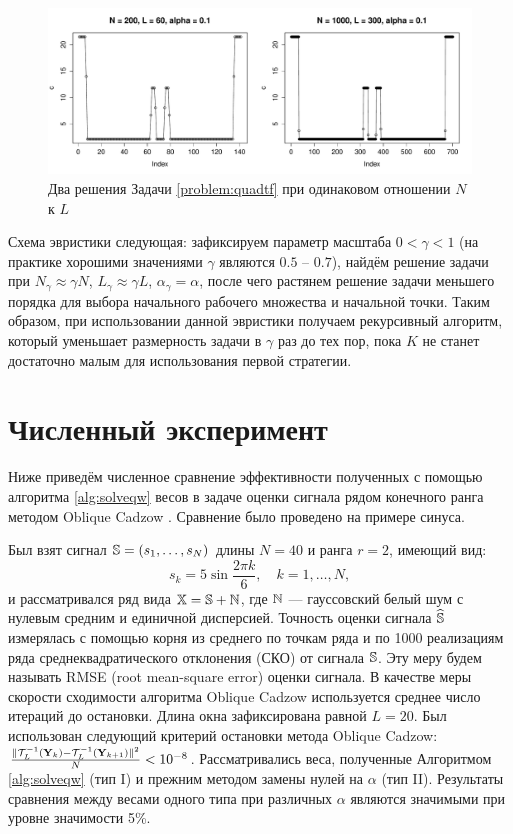 \documentclass[10pt]{article}
\begin{document}
\begin{enumerate}
	\begin{figure}[!hhh]
		\includegraphics[width = \columnwidth]{scale.pdf}
		\caption{Два решения Задачи \ref{problem:quadtf} при одинаковом отношении $N$ к $L$}
		\label{img:scale}
	\end{figure}
	
	Схема эвристики следующая: зафиксируем параметр масштаба $0 < \gamma < 1$ (на практике хорошими значениями $\gamma$ являются $0.5$ -- $0.7$), найдём решение задачи при $N_\gamma \approx \gamma N$, $L_\gamma \approx \gamma L$, $\alpha_\gamma = \alpha$, после чего растянем решение задачи меньшего порядка для выбора начального рабочего множества и начальной точки. Таким образом, при использовании данной эвристики получаем рекурсивный алгоритм, который уменьшает размерность задачи в $\gamma$ раз до тех пор, пока $K$ не станет достаточно малым для использования первой стратегии.
	
\end{enumerate}

\section{Численный эксперимент} \label{sect:numeric}
Ниже приведём численное сравнение эффективности полученных с помощью алгоритма \ref{alg:solveqw} весов в задаче оценки сигнала рядом конечного ранга методом Oblique Cadzow \cite{Zvonarev2015}. Сравнение было проведено на примере синуса.

Был взят сигнал $\mathbb{S} = (s_{1}, \ldots, s_N)$ длины $N = 40$ и ранга $r=2$, имеющий вид:
\begin{equation*}
s_{k} = 5\sin{\frac{2 \pi k}{6}}, \quad k = 1, \ldots, N,
\end{equation*}
и рассматривался ряд вида $\mathbb{X} = \mathbb{S} + \mathbb{N}$, где $\mathbb{N}$ --- гауссовский белый шум с нулевым средним и единичной дисперсией. Точность оценки сигнала $\widehat{\mathbb{S}}$ измерялась с помощью корня из среднего по точкам ряда и по 1000 реализациям ряда среднеквадратического отклонения (СКО) от сигнала $\mathbb{S}$. Эту меру будем называть RMSE (root mean-square error) оценки сигнала. В качестве меры скорости сходимости алгоритма Oblique Cadzow используется среднее число итераций до остановки. Длина окна зафиксирована равной $L = 20$. Был использован следующий критерий остановки метода Oblique Cadzow: $\frac{\|\mathcal{T}_L^{-1}(\mathbf{Y}_k) - \mathcal{T}_L^{-1}(\mathbf{Y}_{k + 1})\|^2}{N} < 10^{-8}$. Рассматривались веса, полученные Алгоритмом \ref{alg:solveqw} (тип I) и прежним методом замены нулей на $\alpha$ \cite[Proposition 5]{Zvonarev2015} (тип II). Результаты сравнения между весами одного типа при различных $\alpha$ являются значимыми при уровне значимости 5\%.
\end{document}
